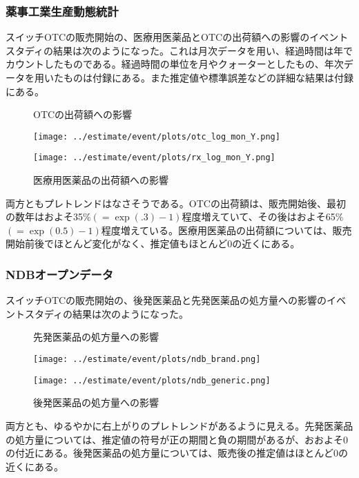 \documentclass[a4paper,11pt,uplatex]{jsarticle}
\theoremstyle{definition}
\begin{document}
\subsubsection{薬事工業生産動態統計}
スイッチOTCの販売開始の、医療用医薬品とOTCの出荷額への影響のイベントスタディの結果は次のようになった。これは月次データを用い、経過時間は年でカウントしたものである。経過時間の単位を月やクォーターとしたもの、年次データを用いたものは付録にある。また推定値や標準誤差などの詳細な結果は付録にある。
\begin{figure}[H]
    \centering
    \begin{minipage}{0.45\textwidth}
        \caption{OTCの出荷額への影響}
        \centering
        \texttt{[image: ../estimate/event/plots/otc\_log\_mon\_Y.png]}
    \end{minipage}\hfill
    \begin{minipage}{0.45\textwidth}
        \caption{医療用医薬品の出荷額への影響}
        \centering
        \texttt{[image: ../estimate/event/plots/rx\_log\_mon\_Y.png]}
    \end{minipage}
\end{figure}
両方ともプレトレンドはなさそうである。OTCの出荷額は、販売開始後、最初の数年はおよそ35\%\((=\exp(.3)-1)\)程度増えていて、その後はおよそ65\%\((=\exp(0.5)-1)\)程度増えている。医療用医薬品の出荷額については、販売開始前後でほとんど変化がなく、推定値もほとんど0の近くにある。

\subsubsection{NDBオープンデータ}
スイッチOTCの販売開始の、後発医薬品と先発医薬品の処方量への影響のイベントスタディの結果は次のようになった。
\begin{figure}[H]
    \centering
    \begin{minipage}{0.45\textwidth}
        \caption{先発医薬品の処方量への影響}
        \centering
        \texttt{[image: ../estimate/event/plots/ndb\_brand.png]}
    \end{minipage}\hfill
    \begin{minipage}{0.45\textwidth}
        \caption{後発医薬品の処方量への影響}
        \centering
        \texttt{[image: ../estimate/event/plots/ndb\_generic.png]}
    \end{minipage}
\end{figure}
両方とも、ゆるやかに右上がりのプレトレンドがあるように見える。先発医薬品の処方量については、推定値の符号が正の期間と負の期間があるが、おおよそ0の付近にある。後発医薬品の処方量については、販売後の推定値はほとんど0の近くにある。
\end{document}
